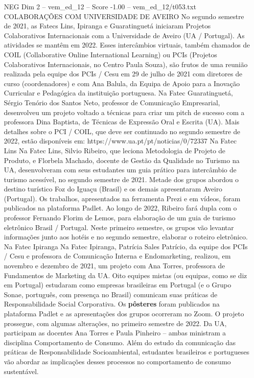 \begin{textsample}{NEG Dim 2 – vem\_ed\_12 – Score -1.00 – vem\_ed\_12/t053.txt}  \label{ex:f2_neg_025}
COLABORAÇÕES COM UNIVERSIDADE DE AVEIRO No segundo semestre de 2021, as Fatecs Lins, Ipiranga e Guaratinguetá iniciaram Projetos Colaborativos Internacionais com a Universidade de Aveiro (UA / Portugal).
As atividades se mantêm em 2022.
Esses intercâmbios virtuais, também chamados de COIL (Collaborative Online International Learning) ou PCIs (Projetos Colaborativos Internacionais, no Centro Paula Souza), são frutos de uma reunião realizada pela equipe dos PCIs / Cesu em 29 de julho de 2021 com diretores de curso (coordenadores) e com Ana Balula, da Equipa de Apoio para a Inovação Curricular e Pedagógica da instituição portuguesa.
Na Fatec Guaratinguetá, Sérgio Tenório dos Santos Neto, professor de Comunicação Empresarial, desenvolveu um projeto voltado a técnicas para criar um pitch de sucesso com a professora Dina Baptista, de Técnicas de Expressão Oral e Escrita (UA).
Mais detalhes sobre o PCI / COIL, que deve ser continuado no segundo semestre de 2022, estão disponíveis em: https://www.ua.pt/pt/noticias/0/72337 Na Fatec Lins Na Fatec Lins, Silvio Ribeiro, que leciona Metodologia de Projeto de Produto, e Florbela Machado, docente de Gestão da Qualidade no Turismo na UA, desenvolveram com seus estudantes um guia prático para intercâmbio de turismo acessível, no segundo semestre de 2021.
Metade dos grupos abordou o destino turístico Foz do Iguaçu (Brasil) e os demais apresentaram Aveiro (Portugal).
Os trabalhos, apresentados na ferramenta Prezi e em vídeos, foram publicados na plataforma Padlet.
Ao longo de 2022, Ribeiro fará dupla com o professor Fernando Florim de Lemos, para elaboração de um guia de turismo eletrônico Brasil / Portugal.
Neste primeiro semestre, os grupos vão levantar informações junto aos hotéis e no segundo semestre, elaborar o roteiro eletrônico.
Na Fatec Ipiranga Na Fatec Ipiranga, Patrícia Sales Patrício, da equipe dos PCIs / Cesu e professora de Comunicação Interna e Endomarketing, realizou, em novembro e dezembro de 2021, um projeto com Ana Torres, professora de Fundamentos de Marketing da UA.
Oito equipes mistas (ou equipas, como se diz em Portugal) estudaram como empresas brasileiras em Portugal (e o Grupo Sonae, português, com presença no Brasil) comunicam suas práticas de Responsabilidade Social Corporativa.
Os \textbf{pôsteres} foram publicados na plataforma Padlet e as apresentações dos grupos ocorreram no Zoom.
O projeto prossegue, com algumas alterações, no primeiro semestre de 2022.
Da UA, participam as docentes Ana Torres e Paula Pinheiro – ambas ministram a disciplina Comportamento de Consumo.
Além do estudo da comunicação das práticas de Responsabilidade Socioambiental, estudantes brasileiros e portugueses vão abordar as implicações desses processos no comportamento de consumo sustentável.

\end{textsample}
